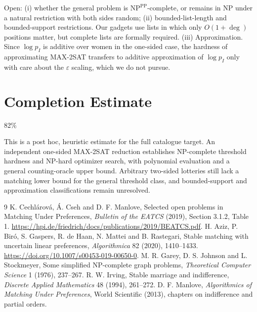 \documentclass[11pt]{article}
\theoremstyle{definition}
\begin{document}
Open: (i) whether the general problem is $\mathrm{NP}^{\mathrm{PP}}$-complete, or remains in NP under a natural
restriction with both sides random; (ii) bounded-list-length and bounded-support restrictions. Our gadgets use lists in
which only $O(1+\deg)$ positions matter, but complete lists are formally required. (iii) Approximation. Since
$\log p_I$ is additive over women in the one-sided case, the hardness of approximating MAX-2SAT transfers to additive
approximation of $\log p_I$ only with care about the $\varepsilon$ scaling, which we do not pursue.

\section{Completion Estimate}
82\%

This is a post hoc, heuristic estimate for the full catalogue target.
An independent one-sided MAX-2SAT reduction establishes NP-complete threshold hardness and NP-hard optimizer search, with polynomial evaluation and a general counting-oracle upper bound. Arbitrary two-sided lotteries still lack a matching lower bound for the general threshold class, and bounded-support and approximation classifications remain unresolved.

\begin{thebibliography}{9}
 K. Cechl\'arov\'a, \'A. Cseh and D. F. Manlove, Selected open problems in Matching Under Preferences,
\emph{Bulletin of the EATCS} (2019), Section 3.1.2, Table 1. \url{https://hpi.de/friedrich/docs/publications/2019/BEATCS.pdf}.
 H. Aziz, P. Bir\'o, S. Gaspers, R. de Haan, N. Mattei and B. Rastegari, Stable matching with uncertain
linear preferences, \emph{Algorithmica} 82 (2020), 1410--1433. \url{https://doi.org/10.1007/s00453-019-00650-0}.
 M. R. Garey, D. S. Johnson and L. Stockmeyer, Some simplified NP-complete graph problems,
\emph{Theoretical Computer Science} 1 (1976), 237--267.
 R. W. Irving, Stable marriage and indifference, \emph{Discrete Applied Mathematics} 48 (1994), 261--272.
 D. F. Manlove, \emph{Algorithmics of Matching Under Preferences}, World Scientific (2013), chapters on
indifference and partial orders.
\end{thebibliography}
\end{document}
